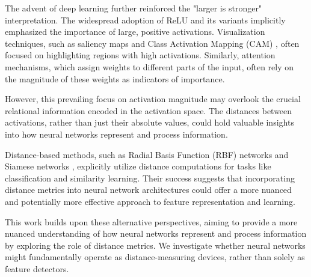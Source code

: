 The advent of deep learning further reinforced the "larger is stronger" interpretation. \cite{krizhevsky2012imagenet,nair2010rectified,simonyan2013deep,zhou2016learning,bahdanau2014neural,vaswani2017attention} The widespread adoption of ReLU and its variants \cite{nair2010rectified,glorot2011deep,krizhevsky2012imagenet} implicitly emphasized the importance of large, positive activations. \cite{krizhevsky2012imagenet,nair2010rectified,simonyan2013deep,zhou2016learning,bahdanau2014neural,vaswani2017attention} Visualization techniques, such as saliency maps \cite{simonyan2013deep} and Class Activation Mapping (CAM) \cite{zhou2016learning}, often focused on highlighting regions with high activations. \cite{krizhevsky2012imagenet,nair2010rectified,simonyan2013deep,zhou2016learning,bahdanau2014neural,vaswani2017attention} Similarly, attention mechanisms, which assign weights to different parts of the input, often rely on the magnitude of these weights as indicators of importance. \cite{krizhevsky2012imagenet,nair2010rectified,simonyan2013deep,zhou2016learning,bahdanau2014neural,vaswani2017attention}

However, this prevailing focus on activation magnitude may overlook the crucial relational information encoded in the activation space. \cite{goodfellow2014explaining,madry2017towards,szegedy2013intriguing} The distances between activations, rather than just their absolute values, could hold valuable insights into how neural networks represent and process information. \cite{goodfellow2014explaining,madry2017towards,szegedy2013intriguing}

Distance-based methods, such as Radial Basis Function (RBF) networks \cite{broomhead1988radial} and Siamese networks \cite{bromley1994signature,schroff2015facenet}, explicitly utilize distance computations for tasks like classification and similarity learning. \cite{weinberger2009distance,von2007tutorial} Their success suggests that incorporating distance metrics into neural network architectures could offer a more nuanced and potentially more effective approach to feature representation and learning. \cite{weinberger2009distance,von2007tutorial}

This work builds upon these alternative perspectives, aiming to provide a more nuanced understanding of how neural networks represent and process information by exploring the role of distance metrics. \cite{oursland2024} We investigate whether neural networks might fundamentally operate as distance-measuring devices, rather than solely as feature detectors. \cite{oursland2024}